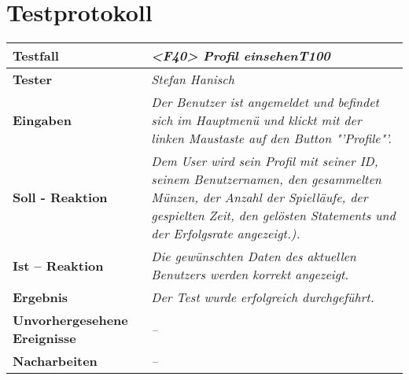 \section{Testprotokoll}

\begin{longtable}{|p{4cm}|p{11cm}|}
\hline
\textbf{Testfall} & \textit{<F40> Profil einsehen\textbf{T100}} \\
\hline
\textbf{Tester} & \textit{Stefan Hanisch} \\
\hline
\textbf{Eingaben} & \textit{Der Benutzer ist angemeldet und befindet sich im Hauptmenü und klickt mit der linken Maustaste auf den Button "'Profile"'.} \\
\hline
\textbf{Soll - Reaktion} & \textit{Dem User wird sein Profil mit seiner ID, seinem Benutzernamen, den gesammelten Münzen, der Anzahl der Spielläufe, der gespielten Zeit, den gelösten Statements und der Erfolgsrate angezeigt.).
} \\
\hline
\textbf{Ist -- Reaktion} & \textit{Die gewünschten Daten des aktuellen Benutzers werden korrekt angezeigt.} \\
\hline
\textbf{Ergebnis} & \textit{Der Test wurde erfolgreich durchgeführt.} \\
\hline
\textbf{Unvorhergesehene Ereignisse} &
\textit{--} \\
\hline
\textbf{Nacharbeiten } & \textit{--} \\
\hline
\end{longtable}
